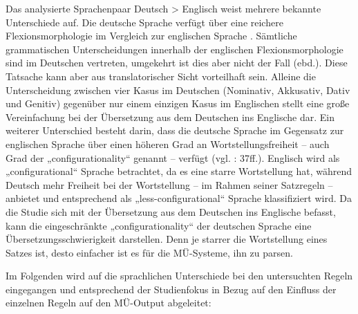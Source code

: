 Das analysierte Sprachenpaar Deutsch > Englisch weist mehrere bekannte Unterschiede auf. Die deutsche Sprache verfügt über eine reichere Flexionsmorphologie im Vergleich zur englischen Sprache \citep[11]{Hawkins1986}. Sämtliche grammatischen Unterscheidungen innerhalb der englischen Flexionsmorphologie sind im Deutschen vertreten, umgekehrt ist dies aber nicht der Fall (ebd.). Diese Tatsache kann aber aus translatorischer Sicht vorteilhaft sein. Alleine die Unterscheidung zwischen vier Kasus im Deutschen (Nominativ, Akkusativ, Dativ und Genitiv) gegenüber nur einem einzigen Kasus im Englischen stellt eine große Vereinfachung bei der Übersetzung aus dem Deutschen ins Englische dar. Ein weiterer Unterschied besteht darin, dass die deutsche Sprache im Gegensatz zur englischen Sprache über einen höheren Grad an Wortstellungsfreiheit -- auch Grad der „configurationality“ genannt -- verfügt (vgl. \citealt{Hawkins1986}: 37ff.). Englisch wird als „configurational“ Sprache betrachtet, da es eine starre Wortstellung hat, während Deutsch mehr Freiheit bei der Wortstellung -- im Rahmen seiner Satzregeln -- anbietet und entsprechend als „less-configurational“ Sprache klassifiziert wird. Da die Studie sich mit der Übersetzung aus dem Deutschen ins Englische befasst, kann die eingeschränkte „configurationality“ der deutschen Sprache eine Übersetzungsschwierigkeit darstellen. Denn je starrer die Wortstellung eines Satzes ist, desto einfacher ist es für die MÜ-Systeme, ihn zu parsen.

Im Folgenden wird auf die sprachlichen Unterschiede bei den untersuchten Regeln eingegangen und entsprechend der Studienfokus in Bezug auf den Einfluss der einzelnen Regeln auf den MÜ-Output abgeleitet:


